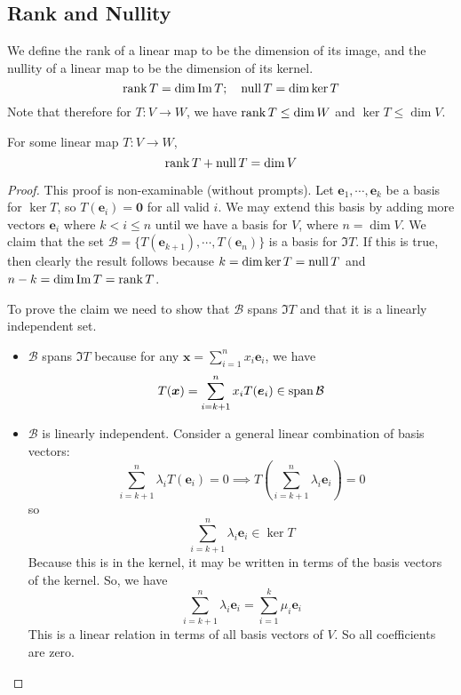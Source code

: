 \documentclass{article}
\begin{document}
	\subsection{Rank and Nullity}
	We define the rank of a linear map to be the dimension of its image, and the nullity of a linear map to be the dimension of its kernel.
	\[ \rank T = \dim \Im T; \quad \operatorname{null} T = \dim \ker T \]
	Note that therefore for $T: V \to W$, we have $\rank T \leq \dim W$ and $\ker T \leq \dim V$.
	\begin{theorem}
		For some linear map $T: V \to W$,
		\[ \rank T + \operatorname{null} T = \dim V \]
	\end{theorem}
	\begin{proof}
		This proof is non-examinable (without prompts). Let $\bm e_1, \cdots, \bm e_k$ be a basis for $\ker T$, so $T(\bm e_i) = \bm 0$ for all valid $i$. We may extend this basis by adding more vectors $\bm e_i$ where $k < i \leq n$ until we have a basis for $V$, where $n=\dim V$. We claim that the set $\mathcal B = \{ T(\bm e_{k+1}), \cdots, T(\bm e_n) \}$ is a basis for $\Im T$. If this is true, then clearly the result follows because $k = \dim \ker T = \operatorname{null} T$ and $n-k = \dim \Im T = \rank T$.

		To prove the claim we need to show that $\mathcal B$ spans $\Im T$ and that it is a linearly independent set.
		\begin{itemize}
			\item $\mathcal B$ spans $\Im T$ because for any $\bm x = \sum_{i=1}^n x_i \bm e_i$, we have
			\[ T(\bm x) = \sum_{i=k+1}^n x_i T(\bm e_i) \in \operatorname{span} \mathcal B \]
			\item $\mathcal B$ is linearly independent. Consider a general linear combination of basis vectors:
			\[ \sum_{i=k+1}^n \lambda_i T(\bm e_i) = 0 \implies T\left( \sum_{i=k+1}^n \lambda_i \bm e_i \right) = 0 \]
			so
			\[ \sum_{i=k+1}^n \lambda_i \bm e_i \in \ker T \]
			Because this is in the kernel, it may be written in terms of the basis vectors of the kernel. So, we have
			\[ \sum_{i=k+1}^n \lambda_i \bm e_i = \sum_{i=1}^k \mu_i \bm e_i \]
			This is a linear relation in terms of all basis vectors of $V$. So all coefficients are zero.
		\end{itemize}
	\end{proof}
\end{document}
